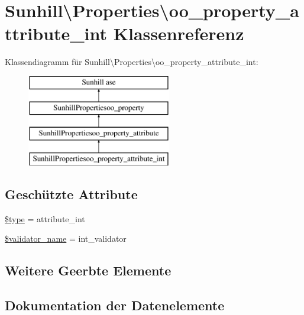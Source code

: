 \hypertarget{classSunhill_1_1Properties_1_1oo__property__attribute__int}{}\section{Sunhill\textbackslash{}Properties\textbackslash{}oo\+\_\+property\+\_\+attribute\+\_\+int Klassenreferenz}
\label{classSunhill_1_1Properties_1_1oo__property__attribute__int}
Klassendiagramm für Sunhill\textbackslash{}Properties\textbackslash{}oo\+\_\+property\+\_\+attribute\+\_\+int\+:\begin{figure}[H]
\begin{center}
\leavevmode
\includegraphics[height=4.000000cm]{dc/d89/classSunhill_1_1Properties_1_1oo__property__attribute__int}
\end{center}
\end{figure}
\subsection*{Geschützte Attribute}
\begin{DoxyCompactItemize}
\item 
\hyperlink{classSunhill_1_1Properties_1_1oo__property__attribute__int_ad1773866bd3068d311d2fd2b36e09ef8}{\$type} = \textquotesingle{}attribute\+\_\+int\textquotesingle{}
\item 
\hyperlink{classSunhill_1_1Properties_1_1oo__property__attribute__int_a602e6ab2603ab06c146dd7a6f575d456}{\$validator\+\_\+name} = \textquotesingle{}int\+\_\+validator\textquotesingle{}
\end{DoxyCompactItemize}
\subsection*{Weitere Geerbte Elemente}


\subsection{Dokumentation der Datenelemente}
\mbox{\label{classSunhill_1_1Properties_1_1oo__property__attribute__int_ad1773866bd3068d311d2fd2b36e09ef8}} 
